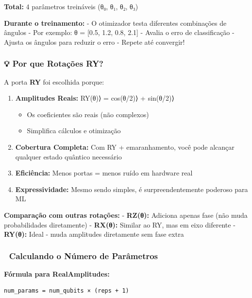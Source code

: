 \documentclass[
  brazilian,
]{report}
\providecommand{\tightlist}{%
  \setlength{\itemsep}{0pt}\setlength{\parskip}{0pt}}
\begin{document}
\textbf{Total:} 4 parâmetros treináveis (θ₀, θ₁, θ₂, θ₃)

\textbf{Durante o treinamento:} - O otimizador testa diferentes
combinações de ângulos - Por exemplo: θ = {[}0.5, 1.2, 0.8, 2.1{]} -
Avalia o erro de classificação - Ajusta os ângulos para reduzir o erro -
Repete até convergir!

\subsubsection{💡 Por que Rotações RY?}\label{por-que-rotauxe7uxf5es-ry}

A porta \textbf{RY} foi escolhida porque:

\begin{enumerate}
\def\labelenumi{\arabic{enumi}.}
\item
  \textbf{Amplitudes Reais:} RY(θ)⟩ = cos(θ/2)⟩ +
  sin(θ/2)⟩

  \begin{itemize}
  \tightlist
  \item
    Os coeficientes são reais (não complexos)
  \item
    Simplifica cálculos e otimização
  \end{itemize}
\item
  \textbf{Cobertura Completa:} Com RY + emaranhamento, você pode
  alcançar qualquer estado quântico necessário
\item
  \textbf{Eficiência:} Menos portas = menos ruído em hardware real
\item
  \textbf{Expressividade:} Mesmo sendo simples, é surpreendentemente
  poderoso para ML
\end{enumerate}

\textbf{Comparação com outras rotações:} - \textbf{RZ(θ):} Adiciona
apenas fase (não muda probabilidades diretamente) - \textbf{RX(θ):}
Similar ao RY, mas em eixo diferente - \textbf{RY(θ):} Ideal - muda
amplitudes diretamente sem fase extra

\subsubsection{🔢 Calculando o Número de
Parâmetros}\label{calculando-o-nuxfamero-de-paruxe2metros}

\textbf{Fórmula para RealAmplitudes:}

\begin{verbatim}
num_params = num_qubits × (reps + 1)
\end{verbatim}
\end{document}
